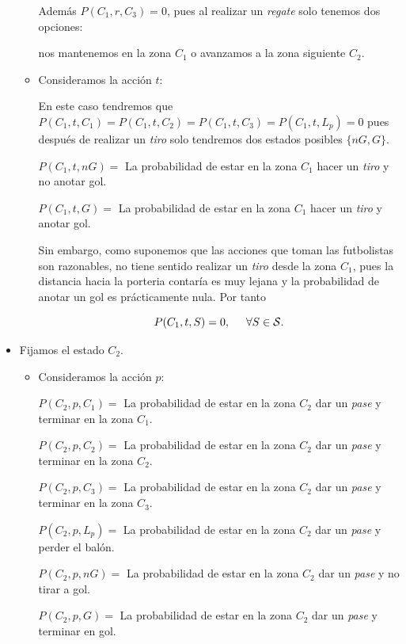 \documentclass[
  us-letterpaper,
  DIV=11,
  numbers=noendperiod]{scrreprt}
\begin{document}
\begin{itemize}
\begin{itemize}
    Además \(P(C_1,r,C_3)=0\), pues al realizar un \emph{regate} solo
    tenemos dos opciones:

    nos mantenemos en la zona \(C_1\) o avanzamos a la zona siguiente
    \(C_2\).
  \item
    Consideramos la acción \(t\):

    En este caso tendremos que
    \(P(C_1,t,C_1)=P(C_1,t,C_2)=P(C_1,t,C_3)=P(C_1,t,L_p)=0\) pues
    después de realizar un \emph{tiro} solo tendremos dos estados
    posibles \(\{nG,G\}\).

    \(P(C_1,t,nG)=\) La probabilidad de estar en la zona \(C_1\) hacer
    un \emph{tiro} y no anotar gol.

    \(P(C_1,t,G)=\) La probabilidad de estar en la zona \(C_1\) hacer un
    \emph{tiro} y anotar gol.

    Sin embargo, como suponemos que las acciones que toman las
    futbolistas son razonables, no tiene sentido realizar un \emph{tiro}
    desde la zona \(C_1\), pues la distancia hacia la porteria contaría
    es muy lejana y la probabilidad de anotar un gol es prácticamente
    nula. Por tanto

    \[
      P(C_1,t,S)=0,\hspace{0.5cm}\forall S\in \mathcal{S}.
      \]
  \end{itemize}
\item
  Fijamos el estado \(C_2\).

  \begin{itemize}
  \item
    Consideramos la acción \(p\):

    \(P(C_2,p,C_1)=\) La probabilidad de estar en la zona \(C_2\) dar un
    \emph{pase} y terminar en la zona \(C_1\).

    \(P(C_2,p,C_2)=\) La probabilidad de estar en la zona \(C_2\) dar un
    \emph{pase} y terminar en la zona \(C_2\).

    \(P(C_2,p,C_3)=\) La probabilidad de estar en la zona \(C_2\) dar un
    \emph{pase} y terminar en la zona \(C_3\).

    \(P(C_2,p,L_p)=\) La probabilidad de estar en la zona \(C_2\) dar un
    \emph{pase} y perder el balón.

    \(P(C_2,p,nG)=\) La probabilidad de estar en la zona \(C_2\) dar un
    \emph{pase} y no tirar a gol.

    \(P(C_2,p,G)=\) La probabilidad de estar en la zona \(C_2\) dar un
    \emph{pase} y terminar en gol.


\end{itemize}
\end{itemize}
\end{document}
